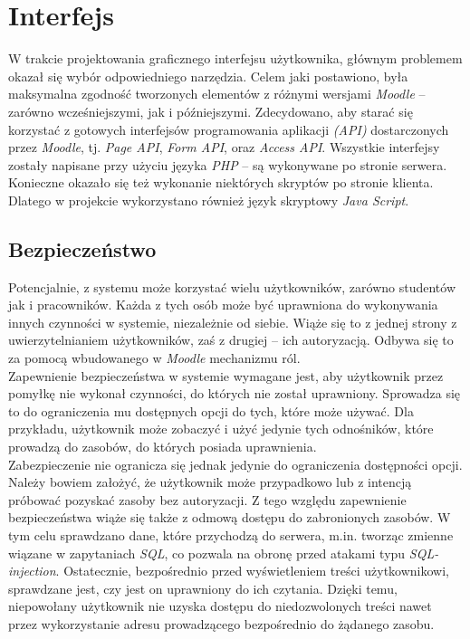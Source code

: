 \section{Interfejs}
\label{Chapter65}

W trakcie projektowania graficznego interfejsu użytkownika, głównym problemem okazał się wybór odpowiedniego narzędzia. Celem jaki postawiono, była maksymalna zgodność tworzonych elementów z różnymi wersjami \textit{Moodle} -- zarówno wcześniejszymi, jak i późniejszymi. Zdecydowano, aby starać się korzystać z gotowych interfejsów programowania aplikacji \textit{(API)} dostarczonych przez \textit{Moodle}, tj. \textit{Page API}, \textit{Form API}, oraz \textit{Access API}. Wszystkie interfejsy zostały napisane przy użyciu języka \textit{PHP} -- są wykonywane po stronie serwera. Konieczne okazało się też wykonanie niektórych skryptów po stronie klienta. Dlatego w projekcie wykorzystano również język skryptowy \textit{Java Script}.

\subsection{Bezpieczeństwo}
\label{Chapter651}

Potencjalnie, z systemu może korzystać wielu użytkowników, zarówno studentów jak i pracowników. Każda z tych osób może być uprawniona do wykonywania innych czynności w systemie, niezależnie od siebie. Wiąże się to z jednej strony z uwierzytelnianiem użytkowników, zaś z drugiej -- ich autoryzacją. Odbywa się to za pomocą wbudowanego w \textit{Moodle} mechanizmu ról. \\

Zapewnienie bezpieczeństwa w systemie wymagane jest, aby użytkownik przez pomyłkę nie wykonał czynności, do których nie został uprawniony. Sprowadza się to do ograniczenia mu dostępnych opcji do tych, które może używać. Dla przykładu, użytkownik może zobaczyć i użyć jedynie tych odnośników, które prowadzą do zasobów, do których posiada uprawnienia. \\

Zabezpieczenie nie ogranicza się jednak jedynie do ograniczenia dostępności opcji. Należy bowiem założyć, że użytkownik może przypadkowo lub z intencją próbować pozyskać zasoby bez autoryzacji. Z tego względu zapewnienie bezpieczeństwa wiąże się także z odmową dostępu do zabronionych zasobów. W tym celu sprawdzano dane, które przychodzą do serwera, m.in. tworząc zmienne wiązane w zapytaniach \textit{SQL}, co pozwala na obronę przed atakami typu \textit{SQL-injection}. Ostatecznie, bezpośrednio przed wyświetleniem treści użytkownikowi, sprawdzane jest, czy jest on uprawniony do ich czytania. Dzięki temu, niepowołany użytkownik nie uzyska dostępu do niedozwolonych treści nawet przez wykorzystanie adresu prowadzącego bezpośrednio do żądanego zasobu.